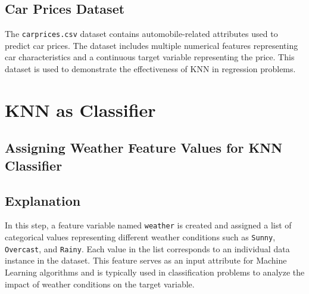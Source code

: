 \documentclass[11pt,a4paper]{report}
\begin{document}
\subsection*{Car Prices Dataset}
The \texttt{carprices.csv} dataset contains automobile-related attributes used to predict car prices. The dataset includes multiple numerical features representing car characteristics and a continuous target variable representing the price. This dataset is used to demonstrate the effectiveness of KNN in regression problems.
   

\section{KNN as Classifier}\label{knn-as-classifier-as-regressor-in-another-program}

\subsection{Assigning Weather Feature Values for KNN Classifier}

\subsection*{Explanation}
In this step, a feature variable named \texttt{weather} is created and assigned a list of categorical values representing different weather conditions such as \texttt{Sunny}, \texttt{Overcast}, and \texttt{Rainy}. Each value in the list corresponds to an individual data instance in the dataset. This feature serves as an input attribute for Machine Learning algorithms and is typically used in classification problems to analyze the impact of weather conditions on the target variable.
\end{document}
